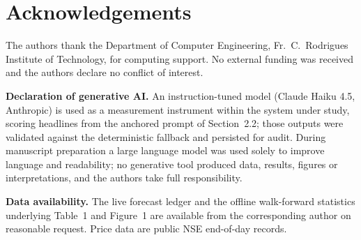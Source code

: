 \documentclass[12pt,a4paper]{article}
\begin{document}
\section{Acknowledgements}

The authors thank the Department of Computer Engineering, Fr.\ C.\ Rodrigues
Institute of Technology, for computing support. No external funding was received and
the authors declare no conflict of interest.

\noindent\textbf{Declaration of generative AI.} An instruction-tuned model (Claude
Haiku 4.5, Anthropic) is used as a measurement instrument within the system under
study, scoring headlines from the anchored prompt of Section~2.2; those outputs were
validated against the deterministic fallback and persisted for audit. During
manuscript preparation a large language model was used solely to improve language
and readability; no generative tool produced data, results, figures or
interpretations, and the authors take full responsibility.

\noindent\textbf{Data availability.} The live forecast ledger and the offline
walk-forward statistics underlying Table~1 and Figure~1 are available from the
corresponding author on reasonable request. Price data are public NSE end-of-day
records.

\end{document}
